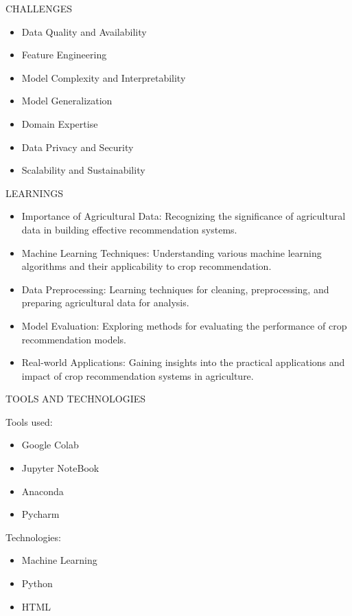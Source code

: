 \documentclass{beamer}
\begin{document}
\begin{frame}{CHALLENGES}
\begin{itemize}
    \item Data Quality and Availability
    \item Feature Engineering
    \item Model Complexity and Interpretability
    \item Model Generalization
    \item Domain Expertise
    \item Data Privacy and Security
    \item Scalability and Sustainability
\end{itemize}
\end{frame}

\begin{frame}{LEARNINGS}
\begin{itemize}
     \item Importance of Agricultural Data: Recognizing the significance of agricultural data in building effective recommendation systems.
    \item Machine Learning Techniques: Understanding various machine learning algorithms and their applicability to crop recommendation.
    \item Data Preprocessing: Learning techniques for cleaning, preprocessing, and preparing agricultural data for analysis.
    \item Model Evaluation: Exploring methods for evaluating the performance of crop recommendation models.
    \item Real-world Applications: Gaining insights into the practical applications and impact of crop recommendation systems in agriculture.
\end{itemize}
\end{frame}

\begin{frame}{TOOLS AND TECHNOLOGIES}
\begin{block}{Tools used:}
\begin{itemize}
\item Google Colab
\item Jupyter NoteBook
\item Anaconda
\item Pycharm
\end{itemize}
\end{block}
\begin{block}{Technologies:}
\begin{itemize}
\item Machine Learning
\item Python
\item HTML
\end{itemize}
\end{block}
\end{frame}
\end{document}
